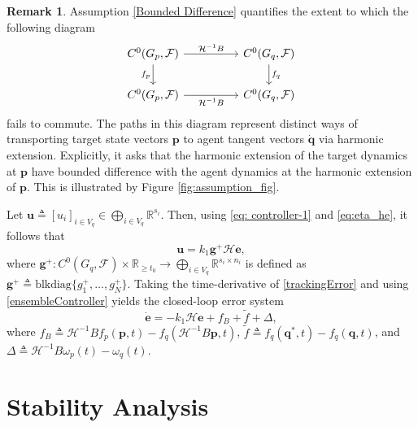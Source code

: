 \documentclass[letterpaper, 10 pt, conference]{ieeeconf}
\newcommand{\maps}{\colon}
\newcommand{\R}{\mathbb{R}}
\newcommand{\FF}{\mathcal{F}}
\theoremstyle{definition}
\newtheorem{remark}{Remark}
\begin{document}
\begin{remark}
    Assumption \ref{Bounded Difference} quantifies the extent to which the following diagram
\[\begin{tikzcd}
	{C^0(G_p,\mathcal{F})} && {C^0(G_q,\mathcal{F})} \\
	{C^0(G_p,\mathcal{F})} && {C^0(G_q,\mathcal{F})}
	\arrow["{\mathcal{H}^{-1}B}", from=1-1, to=1-3]
	\arrow["{f_p}"', from=1-1, to=2-1]
	\arrow["{f_q}", from=1-3, to=2-3]
	\arrow["{\mathcal{H}^{-1}B}"', from=2-1, to=2-3]
\end{tikzcd}\]
    fails to commute. The paths in this diagram represent distinct ways of transporting target state vectors $\mathbf{p}$ to agent tangent vectors $\dot{\mathbf{q}}$ via harmonic extension. Explicitly, it asks that the harmonic extension of the target dynamics at $\mathbf{p}$ have bounded difference with the agent dynamics at the harmonic extension of $\mathbf{p}$. This is illustrated by Figure \ref{fig:assumption_fig}.
\end{remark}

Let $\mathbf{u}\triangleq [u_i]_{i\in V_q} \in \bigoplus_{i\in V_q}\R^{s_i}$. Then, using \eqref{eq: controller-1} and \eqref{eq:eta_he}, it follows that
\begin{equation}\label{ensembleController}
    \mathbf{u}=k_1 \mathbf{g}^+\mathcal{H}\mathbf{e},
\end{equation}
where $\mathbf{g}^+\maps C^0(G_q,\FF)\times\R_{\geq t_0}\to \bigoplus_{i\in V_q}\R^{s_i\times n_i}$ is defined as $\mathbf{g}^+\triangleq\text{blkdiag}\{g_1^+,\ldots,g_N^+ \}$.
Taking the time-derivative of \eqref{trackingError} and using \eqref{ensembleController} yields the closed-loop error system
\begin{equation}\label{eq:error_dynamics}
    \dot{\mathbf{e}} = -k_1\mathcal{H}\mathbf{e} + f_B + \tilde{f} + \Delta,
\end{equation}
where $f_B\triangleq \mathcal{H}^{-1}Bf_p(\mathbf{p},t) - f_q(\mathcal{H}^{-1}B\mathbf{p},t)$, $\tilde{f}\triangleq f_q(\mathbf{q}^*,t) - f_q(\mathbf{q},t)$, and $\Delta\triangleq \mathcal{H}^{-1}B\omega_p(t) - \omega_q(t)$.

\section{Stability Analysis}
\end{document}
